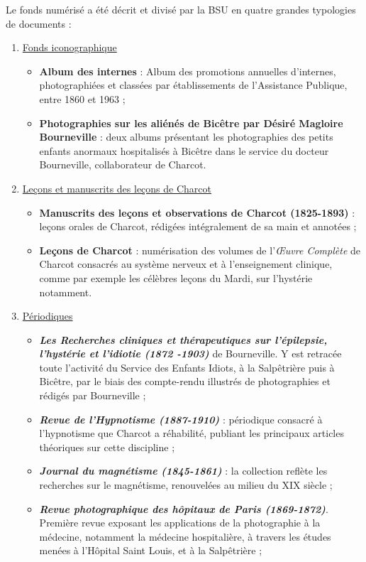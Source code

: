 Le fonds numérisé a été décrit et divisé par la BSU en quatre grandes typologies de documents :
\begin{enumerate}
\item \underline{Fonds iconographique}
\begin{itemize}
\item \textbf{Album des internes} : Album des promotions annuelles d'internes, photographiées et classées par établissements de l'Assistance Publique, entre 1860 et 1963 ;
\item \textbf{Photographies sur les aliénés de Bicêtre par Désiré Magloire Bourneville} : deux albums présentant les photographies des \og{}petits enfants anormaux\fg{} hospitalisés à Bicêtre dans le service du docteur Bourneville, collaborateur de Charcot.
\end{itemize}
\item \underline{Leçons et manuscrits des leçons de Charcot}
\begin{itemize}
\item \textbf{Manuscrits des leçons et observations de Charcot (1825-1893)} : leçons orales de Charcot, rédigées intégralement de sa main et annotées ;
\item \textbf{Leçons de Charcot} : numérisation des volumes de l'\textit{\OE{}uvre Complète} de Charcot consacrés au système nerveux et à l'enseignement clinique, comme par exemple les célèbres leçons du Mardi, sur l'hystérie notamment.
\end{itemize}
\item \underline{Périodiques}
\begin{itemize}
\item \textbf{\textit{Les Recherches cliniques et thérapeutiques sur l'épilepsie, l'hystérie et l'idiotie (1872 -1903)}} de Bourneville. Y est retracée toute l'activité du Service des Enfants Idiots, à la Salpêtrière puis à Bicêtre, par le biais des compte-rendu illustrés de photographies et rédigés par Bourneville ;
\item \textbf{\textit{Revue de l'Hypnotisme (1887-1910)}} : périodique consacré à l'hypnotisme que Charcot a réhabilité, publiant les principaux articles théoriques sur cette discipline ;
\item \textbf{\textit{Journal du magnétisme (1845-1861)}} : la collection reflète les recherches sur le magnétisme, renouvelées au milieu du XIX\ieme{} siècle ; 
\item \textbf{\textit{Revue photographique des hôpitaux de Paris (1869-1872)}}. Première revue exposant les applications de la photographie à la médecine, notamment la médecine hospitalière, à travers les études menées à l'Hôpital Saint Louis, et à la Salpêtrière ;

\end{itemize}
\end{enumerate}
